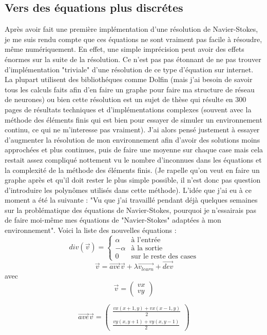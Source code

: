 \documentclass[12pt]{article}
\begin{document}
\subsection{Vers des équations plus discrétes}
Après avoir fait une première implémentation d'une résolution de Navier-Stokes, je me suis rendu compte que ces équations ne sont vraiment pas facile à résoudre, même numériquement. En effet, une simple imprécision peut avoir des effets énormes sur la suite de la résolution. Ce n'est pas pas étonnant de ne pas trouver d'implémentation "triviale" d'une résolution de ce type d'équation sur internet. La plupart utilisent des bibliothéques comme Dolfin (mais j'ai besoin de savoir tous les calculs faits afin d'en faire un graphe pour faire ma structure de réseau de neurones) ou bien cette résolution est un sujet de thèse qui résulte en 300 pages de résultats techniques et d'implémentations complexes (souvent avec la méthode des éléments finis qui est bien pour essayer de simuler un environnement continu, ce qui ne m'interesse pas vraiment). J'ai alors pensé justement à essayer d'augmenter la résolution de mon environnement afin d'avoir des solutions moins approchées et plus continues, puis de faire une moyenne sur chaque case mais cela restait assez compliqué nottement vu le nombre d'inconnues dans les équations et la complexité de la méthode des éléments finis. (Je rapelle qu'on veut en faire un graphe après et qu'il doit rester le plus simple possible, il n'est donc pas question d'introduire les polynômes utilisés dans cette méthode).
L'idée que j'ai eu à ce moment a été la suivante : "Vu que j'ai travaillé pendant déjà quelques semaines sur la problématique des équations de Navier-Stokes, pourquoi je n'essairais pas de faire moi-même mes équations de "Navier-Stokes" adaptées à mon environnement". Voici la liste des nouvelles équations :
\[ div(\overrightarrow{v}) =
\begin{cases}
	\alpha & \text{à l'entrée} \\
	-\alpha & \text{à la sortie} \\
	0 & \text{sur le reste des cases}
\end{cases}
\] 
\[ \overrightarrow{v} = \overrightarrow{ave}\overrightarrow{v} +\lambda\overrightarrow{v_{learn}} +\overrightarrow{dev}\]
avec
\[ \overrightarrow{v} = 
\begin{pmatrix}
vx \\
vy
\end{pmatrix}
\]

\[\overrightarrow{ave}\overrightarrow{v} = 
\begin{pmatrix}
\frac{vx(x+1,y) + vx(x-1,y)}{2} \\
\frac{vy(x,y+1) + vy(x,y-1)}{2}
\end{pmatrix}
\]
\end{document}
